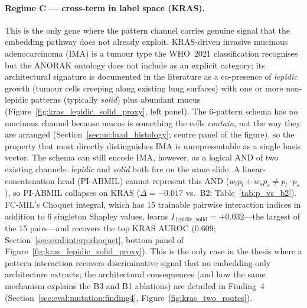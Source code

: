 \paragraph{Regime C --- cross-term in label space (KRAS).}
This is the only gene where the pattern channel carries genuine
signal that the embedding pathway does not already exploit.
KRAS-driven invasive mucinous adenocarcinoma (IMA) is a tumour
type the WHO~2021 classification recognises~\cite{who2021thoracic}
but the ANORAK ontology does not include as an explicit category;
its architectural signature is documented in the literature as a
co-presence of \emph{lepidic} growth (tumour cells creeping along
existing lung surfaces) with one or more non-lepidic patterns
(typically \emph{solid}) plus abundant
mucus~\cite{cha2017imapatterns,hwang2017nonlepidicima,shim2015krasmucinous,rekhtman2013krassolid}
(Figure~\ref{fig:kras_lepidic_solid_proxy}, left panel).
The 6-pattern schema has no mucinous channel because mucus is
something the cells \emph{contain}, not the way they are arranged
(Section~\ref{sec:uc:luad_histology}; centre panel of the figure),
so the property that most directly distinguishes IMA is
unrepresentable as a single basis vector.
The schema can still encode IMA, however, as a logical AND of two
existing channels: \emph{lepidic} and \emph{solid} both fire on
the same slide.
A linear-concatenation head (PI-ABMIL) cannot represent this AND
($w_l p_l + w_s p_s \neq p_l \cdot p_s$), so PI-ABMIL collapses on
KRAS ($\Delta = -0.017$ vs.\ B2; Table~\ref{tab:p_vs_b2}).
FC-MIL's Choquet integral, which has 15 trainable pairwise
interaction indices in addition to 6 singleton Shapley values,
learns $I_{\,\mathrm{lepidic,\,solid}} = +0.032$---the largest of
the 15 pairs---and recovers the top KRAS AUROC ($0.609$;
Section~\ref{sec:eval:interp:choquet}, bottom panel of
Figure~\ref{fig:kras_lepidic_solid_proxy}).
This is the only case in the thesis where a pattern interaction
recovers discriminative signal that no embedding-only architecture
extracts; the architectural consequences (and how the same
mechanism explains the B3 and B1 ablations) are detailed in
Finding~4 (Section~\ref{sec:eval:mutation:finding4},
Figure~\ref{fig:kras_two_routes}).

